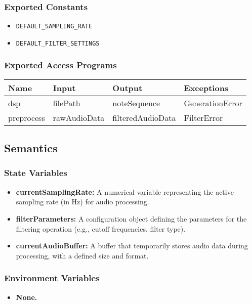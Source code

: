 \documentclass[12pt, titlepage]{article}
\begin{document}
\subsubsection{Exported Constants}  
\begin{itemize}
    \item \texttt{DEFAULT\_SAMPLING\_RATE}  
    \item \texttt{DEFAULT\_FILTER\_SETTINGS}  
\end{itemize}  

\subsubsection{Exported Access Programs}  
\begin{center}  
\begin{tabular}{|p{4cm}|p{3cm}|p{4cm}|p{3.5cm}|}  
\hline  
\textbf{Name} & \textbf{Input} & \textbf{Output} & \textbf{Exceptions} \\  
\hline    
dsp & filePath & noteSequence & GenerationError \\
preprocess & rawAudioData & filteredAudioData & FilterError \\  
\hline  
\end{tabular}  
\end{center}  

\subsection{Semantics}  

\subsubsection{State Variables}
\begin{itemize}
    \item \textbf{currentSamplingRate:} A numerical variable representing the active sampling rate (in Hz) for audio processing.
    \item \textbf{filterParameters:} A configuration object defining the parameters for the filtering operation (e.g., cutoff frequencies, filter type).
    \item \textbf{currentAudioBuffer:} A buffer that temporarily stores audio data during processing, with a defined size and format.
\end{itemize}

\subsubsection{Environment Variables}
\begin{itemize}
    \item \textbf{None.}
\end{itemize}
\end{document}
